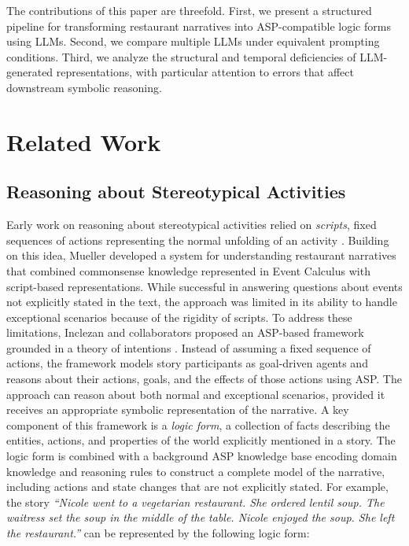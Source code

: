 \documentclass[runningheads]{llncs}
\begin{document}
The contributions of this paper are threefold. First, we present a structured pipeline for transforming restaurant narratives into ASP-compatible logic forms using LLMs. Second, we compare multiple LLMs under equivalent prompting conditions. Third, we analyze the structural and temporal deficiencies of LLM-generated representations, with particular attention to errors that affect downstream symbolic reasoning.




\section{Related Work}
\label{sec:rel_work}


\subsection{Reasoning about Stereotypical Activities}

Early work on reasoning about stereotypical activities relied on \emph{scripts}, fixed sequences of actions representing the normal unfolding of an activity \cite{sa77}. Building on this idea, Mueller \cite{m07} developed a system for understanding restaurant narratives that combined commonsense knowledge represented in Event Calculus with script-based representations. While successful in answering questions about events not explicitly stated in the text, the approach was limited in its ability to handle exceptional scenarios because of the rigidity of scripts.
To address these limitations, Inclezan and collaborators \cite{Inclezan2017UnderstandingRS,InclezanZBI18} proposed an ASP-based framework grounded in a theory of intentions \cite{bgb15}. Instead of assuming a fixed sequence of actions, the framework models story participants as goal-driven agents and reasons about their actions, goals, and the effects of those actions using ASP. The approach can reason about both normal and exceptional scenarios, provided it receives an appropriate symbolic representation of the narrative.
A key component of this framework is a \emph{logic form}, a collection of facts describing the entities, actions, and properties of the world explicitly mentioned in a story. The logic form is combined with a background ASP knowledge base encoding domain knowledge and reasoning rules to construct a complete model of the narrative, including actions and state changes that are not explicitly stated. For example, the story \textit{``Nicole went to a vegetarian restaurant. She ordered lentil soup. The waitress set the soup in the middle of the table. Nicole enjoyed the soup. She left the restaurant.''}
can be represented by the following logic form:
\end{document}
